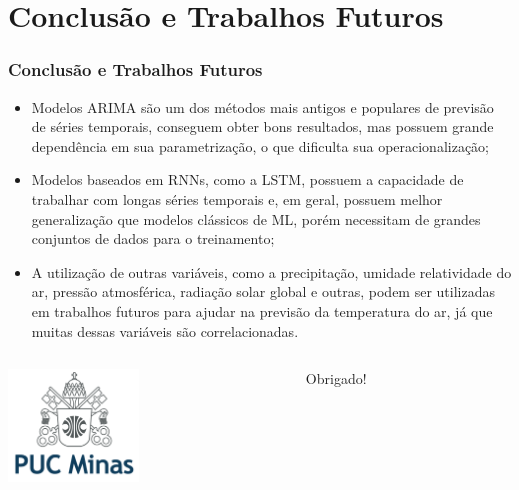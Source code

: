 \documentclass[aspectratio=169]{beamer}
\begin{document}
\section{Conclusão e Trabalhos Futuros}

\begin{frame}
\frametitle{Conclusão e Trabalhos Futuros}

\begin{itemize}
   	\item Modelos ARIMA são um dos métodos mais antigos e populares de previsão de séries temporais, conseguem obter bons resultados, mas possuem grande dependência em sua parametrização, o que dificulta sua operacionalização; 
   	\item Modelos baseados em RNNs, como a LSTM, possuem a capacidade de trabalhar com longas séries temporais e, em geral, possuem melhor generalização que modelos clássicos de ML, porém necessitam de grandes conjuntos de dados para o treinamento;  
	\item A utilização de outras variáveis, como a precipitação, umidade relatividade do ar, pressão atmosférica, radiação solar global  e outras, podem ser utilizadas em trabalhos futuros para ajudar na previsão da temperatura do ar, já que muitas dessas variáveis são correlacionadas.  
\end{itemize}
\end{frame}


% 	


\begin{frame}
	\begin{columns}
		\begin{column}{3cm}
			\includegraphics[height=3cm]{figuras/logo.png}
		\end{column}
		\begin{column}{7cm}
			\begin{flushright}
				\centering
				\vskip 0.5cm
				\Huge Obrigado!
			\end{flushright}
		\end{column}
	\end{columns}
\end{frame}


\end{document}
